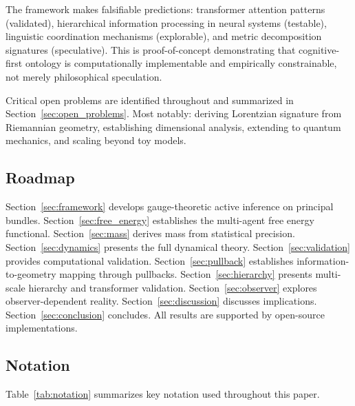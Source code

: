 \documentclass[11pt]{article}
\begin{document}
The framework makes falsifiable predictions: transformer attention patterns (validated), hierarchical information processing in neural systems (testable), linguistic coordination mechanisms (explorable), and metric decomposition signatures (speculative). This is proof-of-concept demonstrating that cognitive-first ontology is computationally implementable and empirically constrainable, not merely philosophical speculation.

Critical open problems are identified throughout and summarized in Section~\ref{sec:open_problems}. Most notably: deriving Lorentzian signature from Riemannian geometry, establishing dimensional analysis, extending to quantum mechanics, and scaling beyond toy models.

\subsection{Roadmap}

Section~\ref{sec:framework} develops gauge-theoretic active inference on principal bundles. Section~\ref{sec:free_energy} establishes the multi-agent free energy functional. Section~\ref{sec:mass} derives mass from statistical precision. Section~\ref{sec:dynamics} presents the full dynamical theory. Section~\ref{sec:validation} provides computational validation. Section~\ref{sec:pullback} establishes information-to-geometry mapping through pullbacks. Section~\ref{sec:hierarchy} presents multi-scale hierarchy and transformer validation. Section~\ref{sec:observer} explores observer-dependent reality. Section~\ref{sec:discussion} discusses implications. Section~\ref{sec:conclusion} concludes. All results are supported by open-source implementations.

\subsection{Notation}
\label{sec:notation}

Table~\ref{tab:notation} summarizes key notation used throughout this paper.
\end{document}
